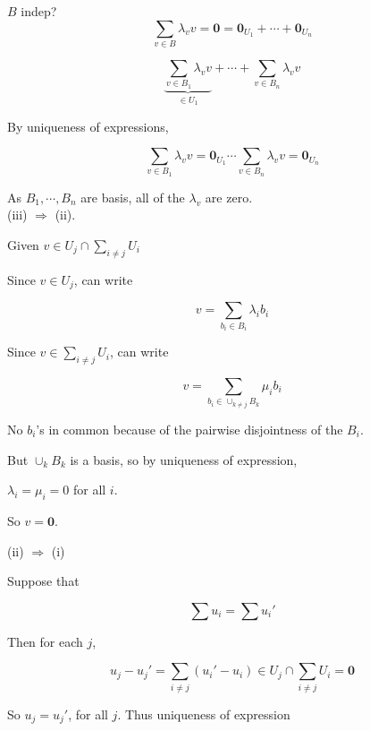 \documentclass[a4paper]{article}
\begin{document}
$ B $ indep? \[ \sum_{v \in B} \lambda_{v} v = \mathbf{0} = \mathbf{0}_{U_{1}} + \cdots + \mathbf{0}_{U_{n}} \]

\[ \underbrace{\sum_{v \in B_{1}} \lambda_{v} v}_{\in U_{1}} + \cdots + \sum_{v \in B_{n}} \lambda_{v} v \]


By uniqueness of expressions, 

\[ \sum_{v \in B_{1}} \lambda_{v} v = \mathbf{0}_{U_{1}} \cdots \sum_{v \in B_{n}} \lambda_{v} v = \mathbf{0}_{U_{n}} \]

As $ B_{1}, \cdots, B_{n} $ are basis, all of the $ \lambda_{v} $ are zero. \\


(iii) $ \Rightarrow $ (ii). 

Given $ v \in U_{j} \cap \sum_{i\neq j} U_{i} $

Since $ v \in U_{j} $, can write

\[ v = \sum_{b_{i} \in B_{i}} \lambda_{i} b_{i} \]

Since $ v \in \sum_{i\neq j} U_{i} $, can write

\[ v = \sum_{b_{i} \in \cup_{k \neq j}B_{k}} \mu_{i} b_{i} \]

No $ b_{i} $'s in common because of the pairwise disjointness of the $ B_{i} $.

But $ \cup_{k} B_{k} $ is a basis, so by uniqueness of expression, 

$ \lambda_{i} = \mu_{i} = 0 $ for all $ i $.

So $ v = \mathbf{0} $.

(ii) $ \Rightarrow $ (i)

Suppose  that

\[ \sum u_{i} = \sum u_{i}' \]

Then for each $ j $,

\[ u_{j} - u_{j}'  = \sum_{i \neq j} (u_{i}' - u_{i} )  \in U_{j} \cap \sum_{i \neq j} U_{i} = \mathbf{0}  \]

So $ u_{j} = u_{j}' $, for all $ j $. Thus uniqueness of expression

	
	
	
	
	
	
\end{document}
